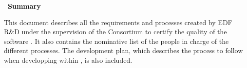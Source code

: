 \begin{center}
\textbf{\large\ Summary}\\
\end{center}
This document describes all the requirements and processes created by EDF R\&D
under the supervision of the Consortium to certify the quality of the software
\telemacsystem. It also contains the nominative list of the people in charge of the
different processes. The development plan, which describes the process to follow when
developping within \telemacsystem, is also included.\\
% 

